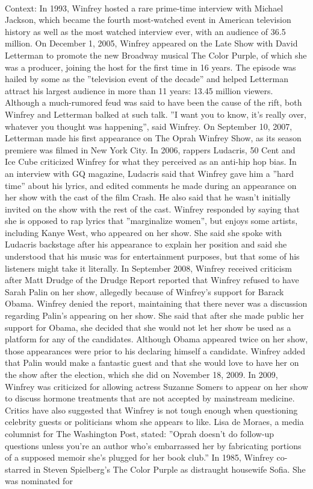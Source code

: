 \documentclass[11pt,a4paper, onecolumn]{article}
\begin{document}
\\ Context: In 1993, Winfrey hosted a rare prime-time interview with Michael Jackson, which became the fourth most-watched event in American television history as well as the most watched interview ever, with an audience of 36.5 million. On December 1, 2005, Winfrey appeared on the Late Show with David Letterman to promote the new Broadway musical The Color Purple, of which she was a producer, joining the host for the first time in 16 years. The episode was hailed by some as the ''television event of the decade'' and helped Letterman attract his largest audience in more than 11 years: 13.45 million viewers. Although a much-rumored feud was said to have been the cause of the rift, both Winfrey and Letterman balked at such talk. ''I want you to know, it's really over, whatever you thought was happening'', said Winfrey. On September 10, 2007, Letterman made his first appearance on The Oprah Winfrey Show, as its season premiere was filmed in New York City. In 2006, rappers Ludacris, 50 Cent and Ice Cube criticized Winfrey for what they perceived as an anti-hip hop bias. In an interview with GQ magazine, Ludacris said that Winfrey gave him a ''hard time'' about his lyrics, and edited comments he made during an appearance on her show with the cast of the film Crash. He also said that he wasn't initially invited on the show with the rest of the cast. Winfrey responded by saying that she is opposed to rap lyrics that ''marginalize women'', but enjoys some artists, including Kanye West, who appeared on her show. She said she spoke with Ludacris backstage after his appearance to explain her position and said she understood that his music was for entertainment purposes, but that some of his listeners might take it literally. In September 2008, Winfrey received criticism after Matt Drudge of the Drudge Report reported that Winfrey refused to have Sarah Palin on her show, allegedly because of Winfrey's support for Barack Obama. Winfrey denied the report, maintaining that there never was a discussion regarding Palin's appearing on her show. She said that after she made public her support for Obama, she decided that she would not let her show be used as a platform for any of the candidates. Although Obama appeared twice on her show, those appearances were prior to his declaring himself a candidate. Winfrey added that Palin would make a fantastic guest and that she would love to have her on the show after the election, which she did on November 18, 2009. In 2009, Winfrey was criticized for allowing actress Suzanne Somers to appear on her show to discuss hormone treatments that are not accepted by mainstream medicine. Critics have also suggested that Winfrey is not tough enough when questioning celebrity guests or politicians whom she appears to like. Lisa de Moraes, a media columnist for The Washington Post, stated: ''Oprah doesn't do follow-up questions unless you're an author who's embarrassed her by fabricating portions of a supposed memoir she's plugged for her book club.'' In 1985, Winfrey co-starred in Steven Spielberg's The Color Purple as distraught housewife Sofia. She was nominated for 
\end{document}
